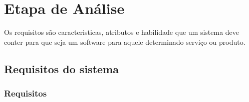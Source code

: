 

\chapter{Etapa de An\'{a}lise}
Os requisitos são caracteristicas, atributos e habilidade que um sistema deve conter para que seja um software
para aquele determinado serviço ou produto.
 \section{Requisitos do sistema}
 \subsection{Requisitos}
